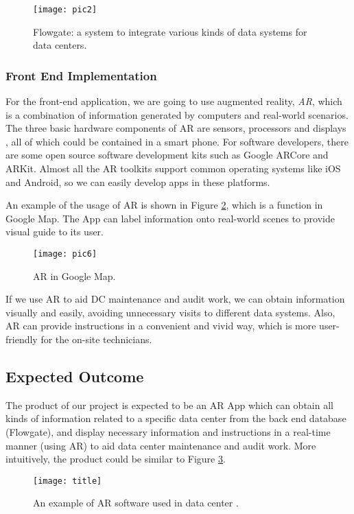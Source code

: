 \documentclass[11pt,a4paper]{article}
\begin{document}
\begin{onehalfspace}
\begin{figure}[H]
	\centering
	\texttt{[image: pic2]}
	\caption{Flowgate: a system to integrate various kinds of data systems for data centers.}
	\label{flowgate}
\end{figure}

\subsubsection{Front End Implementation}
For the front-end application, we are going to use augmented reality, \textit{AR}, which is a combination of information generated by computers and real-world scenarios. The three basic hardware components of AR are sensors, processors and displays \cite{xjl4}, all of which could be contained in a smart phone. For software developers, there are some open source software development kits such as Google ARCore and ARKit. Almost all the AR toolkits support common operating systems like iOS and Android, so we can easily develop apps in these platforms. 

An example of the usage of AR is shown in Figure \ref{google}, which is a function in Google Map. The App can label information onto real-world scenes to provide visual guide to its user.

\begin{figure}[H]
	\centering
	\texttt{[image: pic6]}
	\caption{AR in Google Map.}
	\label{google}
\end{figure}

If we use AR to aid DC maintenance and audit work, we can obtain information visually and easily, avoiding unnecessary visits to different data systems. Also, AR can provide instructions in a convenient and vivid way, which is more user-friendly for the on-site technicians.

\subsection{Expected Outcome}
The product of our project is expected to be an AR App which can obtain all kinds of information related to a specific data center from the back end database (Flowgate), and display necessary information and instructions in a real-time manner (using AR) to aid data center maintenance and audit work. More intuitively, the product could be similar to Figure \ref{cover}.

\begin{figure}[H]
	\centering
	\texttt{[image: title]}
	\caption{An example of AR software used in data center \footnotemark.}
	\label{cover}
\end{figure}


\end{onehalfspace}
\end{document}
